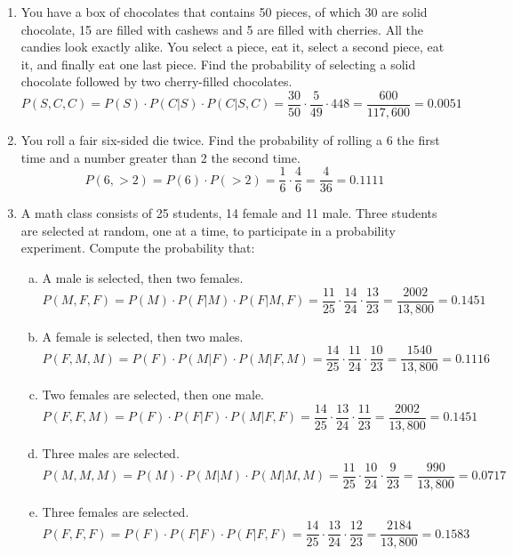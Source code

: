 \begin{enumerate}
\item You have a box of chocolates that contains 50 pieces, of which 30 are solid chocolate,
15 are filled with cashews and 5 are filled with cherries. All the candies look exactly alike.
You select a piece, eat it, select a second piece, eat it, and finally eat one last piece. Find the probability of selecting a solid chocolate followed by two cherry-filled chocolates. 
\[P(S,C,C) = P(S) \cdot P(C | S) \cdot P(C | S,C) = \dfrac{30}{50} \cdot \dfrac{5}{49} \cdot {4}{48} = \dfrac{600}{117,600} = 0.0051\]

\item You roll a fair six-sided die twice. Find the probability of rolling a 6 the first time
and a number greater than 2 the second time. 
\[P(6,>2) = P(6) \cdot P(>2) = \dfrac{1}{6} \cdot \dfrac{4}{6} = \dfrac{4}{36} = 0.1111\]

\item A math class consists of 25 students, 14 female and 11 male. Three students are selected at random, one at a time, to participate in a probability experiment. Compute the probability that:
\begin{enumerate}[(a)]
\item A male is selected, then two females. 
\[P(M,F,F) = P(M) \cdot P(F | M) \cdot P(F | M,F) = \dfrac{11}{25} \cdot \dfrac{14}{24} \cdot \dfrac{13}{23} = \dfrac{2002}{13,800} = 0.1451\]
\item A female is selected, then two males. 
\[P(F,M,M) = P(F) \cdot P(M | F) \cdot P(M | F,M) = \dfrac{14}{25} \cdot \dfrac{11}{24} \cdot \dfrac{10}{23} = \dfrac{1540}{13,800} = 0.1116\]
\item Two females are selected, then one male. 
\[P(F,F,M) = P(F) \cdot P(F | F) \cdot P(M | F,F) = \dfrac{14}{25} \cdot \dfrac{13}{24} \cdot \dfrac{11}{23} = \dfrac{2002}{13,800} = 0.1451\]
\item Three males are selected. 
\[P(M,M,M) = P(M) \cdot P(M | M) \cdot P(M | M,M) = \dfrac{11}{25} \cdot \dfrac{10}{24} \cdot \dfrac{9}{23} = \dfrac{990}{13,800} = 0.0717\]
\item Three females are selected. 
\[P(F,F,F) = P(F) \cdot P(F | F) \cdot P(F | F,F) = \dfrac{14}{25} \cdot \dfrac{13}{24} \cdot \dfrac{12}{23} = \dfrac{2184}{13,800} = 0.1583\]
\end{enumerate}
\pagebreak


\end{enumerate}
